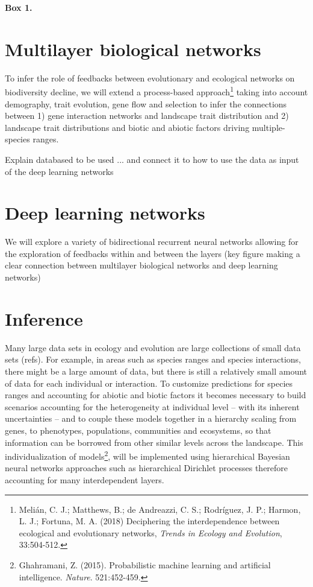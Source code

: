 \documentclass[authoryear,1p,12pt]{elsarticle}
\begin{document}
\begin{mybox}\begin{singlespace}
{\bf{Box 1. }}\\
\begin{small}
  \section*{Multilayer biological networks}
  To infer the role of feedbacks between evolutionary and ecological
  networks on biodiversity decline, we will extend a process-based
  approach\footnote{Melián, C. J.; Matthews, B.; de Andreazzi, C. S.;
    Rodríguez, J. P.; Harmon, L. J.; Fortuna, M. A. (2018) Deciphering
    the interdependence between ecological and evolutionary networks,
    {\em Trends in Ecology and Evolution}, 33:504-512.} taking into
  account demography, trait evolution, gene flow and selection to
  infer the connections between 1) gene interaction networks and
  landscape trait distribution and 2) landscape trait distributions
  and biotic and abiotic factors driving multiple-species ranges.

  Explain databased to be used ... and connect it to how to use the
  data as input of the deep learning networks

  \section*{Deep learning networks}
  We will explore a variety of bidirectional recurrent neural networks
  allowing for the exploration of feedbacks within and between the
  layers (key figure making a clear connection between multilayer
  biological networks and deep learning networks)

  \section*{Inference}
  Many large data sets in ecology and evolution are large collections
  of small data sets (refs). For example, in areas such as species
  ranges and species interactions, there might be a large amount of
  data, but there is still a relatively small amount of data for each
  individual or interaction. To customize predictions for species
  ranges and accounting for abiotic and biotic factors it becomes
  necessary to build scenarios accounting for the heterogeneity at
  individual level -- with its inherent uncertainties -- and to couple
  these models together in a hierarchy scaling from genes, to
  phenotypes, populations, communities and ecosystems, so that
  information can be borrowed from other similar levels across the
  landscape. This individualization of models\footnote{Ghahramani,
    Z. (2015). Probabilistic machine learning and artificial
    intelligence. {\em Nature}. 521:452-459.}, will be implemented
  using hierarchical Bayesian neural networks approaches such as
  hierarchical Dirichlet processes therefore accounting for many
  interdependent layers.
 \end{small}
\end{singlespace}
\end{mybox}
\end{document}
